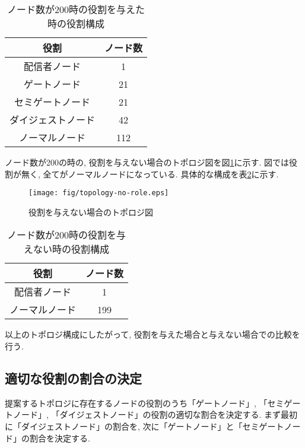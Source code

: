 \begin{table}[h]
  \caption{ノード数が200時の役割を与えた時の役割構成}
  \label{tbl:topology-ex}
  \centering
      {\small
        \begin{tabular}{|c|c|} \hline
        役割 & ノード数 \\ \hline \hline
        配信者ノード & 1 \\ \hline
        ゲートノード & 21 \\ \hline
        セミゲートノード & 21 \\ \hline
        ダイジェストノード & 42 \\ \hline
        ノーマルノード & 112 \\ \hline
        \end{tabular}
      }
\end{table}

ノード数が200の時の, 役割を与えない場合のトポロジ図を図\ref{fig:topology-no-role}に示す. 図では役割が無く, 全てがノーマルノードになっている. 具体的な構成を表\ref{tbl:topology-ex-no-role}に示す.

\begin{figure}[h]
  \centering
  \texttt{[image: fig/topology-no-role.eps]}
  \caption{役割を与えない場合のトポロジ図}
  \label{fig:topology-no-role}
\end{figure}

\newpage

\begin{table}[h]
  \caption{ノード数が200時の役割を与えない時の役割構成}
  \label{tbl:topology-ex-no-role}
  \centering
      {\small
        \begin{tabular}{|c|c|} \hline
        役割 & ノード数 \\ \hline \hline
        配信者ノード & 1 \\ \hline
        ノーマルノード & 199 \\ \hline
        \end{tabular}
      }
\end{table}

以上のトポロジ構成にしたがって, 役割を与えた場合と与えない場合での比較を行う.

\subsection{適切な役割の割合の決定}
提案するトポロジに存在するノードの役割のうち「ゲートノード」, 「セミゲートノード」, 「ダイジェストノード」の役割の適切な割合を決定する. まず最初に「ダイジェストノード」の割合を, 次に「ゲートノード」と「セミゲートノード」の割合を決定する.

